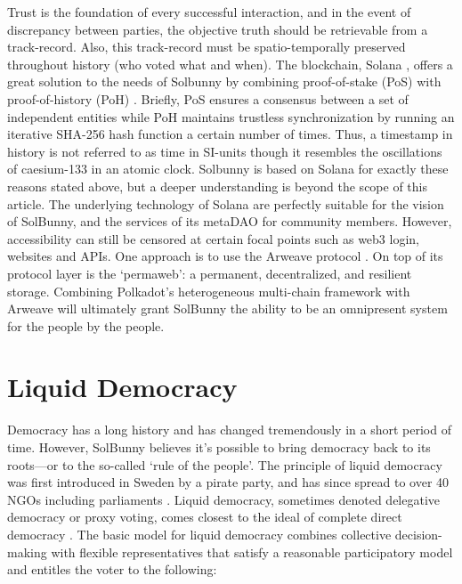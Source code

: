 \documentclass[12pt]{article}
\begin{document}
Trust is the foundation of every successful interaction, and in the event of discrepancy between parties, the objective truth should be retrievable from a track-record. Also, this track-record must be spatio-temporally preserved throughout history (who voted what and when). The blockchain, Solana \cite{SolanaWhitepaper}, offers a great solution to the needs of Solbunny by combining proof-of-stake (PoS) with proof-of-history (PoH) \cite{solanaIntro}. Briefly, PoS ensures a consensus between a set of independent entities while PoH maintains trustless synchronization by running an iterative SHA-256 hash function a certain number of times. Thus, a timestamp in history is not referred to as time in SI-units though it resembles the oscillations of caesium-133 in an atomic clock. Solbunny is based on Solana for exactly these reasons stated above, but a deeper understanding is beyond the scope of this article. The underlying technology of Solana are perfectly suitable for the vision of SolBunny, and the services of its metaDAO for community members. However, accessibility can still be censored at certain focal points such as web3 login, websites and APIs. One approach is to use the Arweave protocol \cite{arweave}. On top of its protocol layer is the ‘permaweb’: a permanent, decentralized, and resilient storage. Combining Polkadot’s heterogeneous multi-chain framework \cite{polkadot} with Arweave will ultimately grant SolBunny the ability to be an omnipresent system for the people by the people.

\section*{Liquid Democracy}
Democracy has a long history and has changed tremendously in a short period of time. However, SolBunny believes it's possible to bring democracy back to its roots—or to the so-called ‘rule of the people’. The principle of liquid democracy was first introduced in Sweden by a pirate party, and has since spread to over 40 NGOs including parliaments \cite{liquidDemocracy}. Liquid democracy, sometimes denoted delegative democracy or proxy voting, comes closest to the ideal of complete direct democracy \cite{id1, steffenGanghof}. The basic model for liquid democracy combines collective decision-making with flexible representatives that satisfy a reasonable participatory model and entitles the voter to the following:
\end{document}
